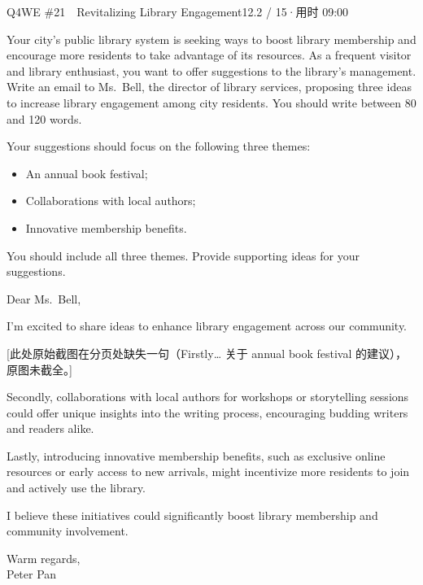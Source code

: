 \begin{qblock}{Q4\quad WE \#21\ \ Revitalizing Library Engagement}{12.2 / 15\quad·\quad 用时 09:00}

\begin{promptbox}
Your city's public library system is seeking ways to boost library membership and encourage more residents to take advantage of its resources. As a frequent visitor and library enthusiast, you want to offer suggestions to the library's management. Write an email to Ms.\ Bell, the director of library services, proposing three ideas to increase library engagement among city residents. You should write between 80 and 120 words.

\smallskip Your suggestions should focus on the following three themes:
\begin{itemize}[leftmargin=1.4em,topsep=2pt,itemsep=0pt]
  \item An annual book festival;
  \item Collaborations with local authors;
  \item Innovative membership benefits.
\end{itemize}
You should include all three themes. Provide supporting ideas for your suggestions.
\end{promptbox}

\begin{modelbox}
Dear Ms.\ Bell,

I'm excited to share ideas to enhance library engagement across our community.

{\color{cWrong}\footnotesize[此处原始截图在分页处缺失一句（Firstly… 关于 annual book festival 的建议），原图未截全。]}

Secondly, collaborations with local authors for workshops or storytelling sessions could offer unique insights into the writing process, encouraging budding writers and readers alike.

Lastly, introducing innovative membership benefits, such as exclusive online resources or early access to new arrivals, might incentivize more residents to join and actively use the library.

I believe these initiatives could significantly boost library membership and community involvement.

Warm regards,\\ Peter Pan
\end{modelbox}


\end{qblock}
